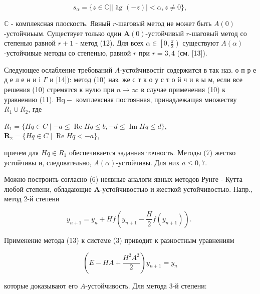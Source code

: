 \documentclass[10pt]{article}
\begin{document}
\[

s_{\alpha}=\{z \in \mathbb{C}|| \text { äg }(-z) \mid<\alpha, z \neq 0\},

\]



$\mathbb{C}$ - комплексная плоскость. Явный $r$-шаговый метод не может быть $A(0)$-устойчиьым. Существует только один $\boldsymbol{A}(0)$-устойчивый $r$-шаговый метод со степенью равной $r+1$ - метод (12). Для всех $\alpha \in\left[0, \frac{\pi}{2}\right)$ существуют $A(\alpha)$-устойчивые методы со степенью, равной $r$ при $r=3,4$ (см. [13]).



Следующее ослабление требований $A$-устойчивостіг содержится в так наз. о п р е д е л е н и і $\Gamma$ и [14]): метод (10) наз. же с т к о у с т о й ч и в ы м, если все решения (10) стремятся к нулю при $n \rightarrow \infty$ в случае применения (10) к уравнению (11). $\mathrm{Hq}-$ комплексная постоянная, принадлежащая множеству $R_{1} \cup R_{2}$, где



$R_{1}=\{H q \in C \mid-a \leqslant \operatorname{Re} H q \leqslant b,-d \leqslant \operatorname{Im} H q \leqslant d\}$, $\boldsymbol{R}_{2}=\{H q \in C \mid \operatorname{Re} H q<-a\}$,



причем для $H q \in R_{1}$ обеспечивается заданная точность. Методы (7) жестко устойчивы и, следовательно, $A(\alpha)$-устойчивы. Для них $a \leqslant 0,7$.



Можно построить согласно (6) неявные аналоги явных методов Рунге - Кутта любой степени, обладающие $\boldsymbol{A}$-устойчивостью и жесткой устойчивостью. Напр., метод 2-й степени



\[

y_{n+1}=y_{n}+H f\left(y_{n+1}-\frac{H}{2} f\left(y_{n+1}\right)\right) \text {. }

\]



Применение метода (13) к системе (3) приводит к разностным уравнениям



\[

\left(E-H A+\frac{H^{2} A^{2}}{2}\right) y_{n+1}=y_{n}

\]



которые доказывают его $A$-устойчивость. Для метода 3-й степени:
\end{document}
